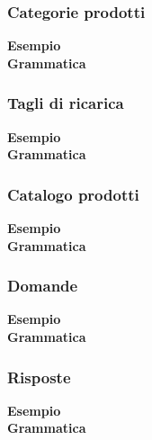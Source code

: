 \documentclass[a4paper, 14pt]{article}
\begin{document}
\begin{flushleft}
				\subsubsection{Categorie prodotti}
					\textbf{Esempio}\\ 
					
					\bigskip \textbf{Grammatica}\\
					
				
				
				\subsubsection{Tagli di ricarica}
					\textbf{Esempio}\\ 
						
					\bigskip \textbf{Grammatica}\\
						
						
				\newpage
				\subsubsection{Catalogo prodotti}
					\textbf{Esempio}\\ 
					
					\bigskip \textbf{Grammatica}\\
					
				\subsubsection{Domande}
					\textbf{Esempio}\\ 
					
					\bigskip \textbf{Grammatica}\\
					
				\newpage
				\subsubsection{Risposte}
					\textbf{Esempio}\\ 
					
					\bigskip \textbf{Grammatica}\\
					
				\newpage

\end{flushleft}
\end{document}
